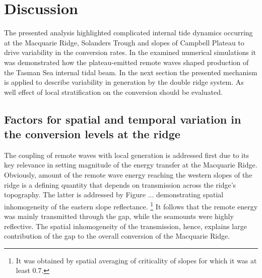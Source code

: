 \documentclass[12pt]{article}
\begin{document}
\newpage
\section{Discussion}
\label{C3.sec:disc}
The presented analysis highlighted complicated internal tide dynamics occurring at the Macquarie 
Ridge, Solanders Trough and slopes of Campbell Plateau to drive variability in the conversion 
rates. In the examined numerical simulations it was demonstrated how the plateau-emitted remote 
waves shaped production of the Tasman Sea internal tidal beam. In the next section the presented 
mechanism is applied to describe variability in generation by the double ridge system. As well 
effect of local stratification on the conversion should be evaluated. 

\subsection{Factors for spatial and temporal variation in the conversion levels at the ridge}
\label{C3.sec:disc_conv}
The coupling of remote waves with local generation is addressed first due to its key relevance in 
setting magnitude of the energy transfer at the Macquarie Ridge. Obviously, amount of the remote 
wave energy reaching the western slopes of the ridge is a defining quantity that depends on 
transmission 
across the ridge's topography. The latter is addressed by Figure ... demonstrating spatial 
inhomogeneity of 
the eastern slope reflectance. \footnote{It was obtained by spatial averaging of criticality of 
slopes 
for which it was at least 0.7.} It follows that the remote energy was mainly transmitted through 
the 
gap, while the seamounts were highly reflective. The spatial inhomogeneity of the transmission, 
hence, explains large contribution of the gap to the overall conversion of the Macquarie Ridge.\\
\end{document}
